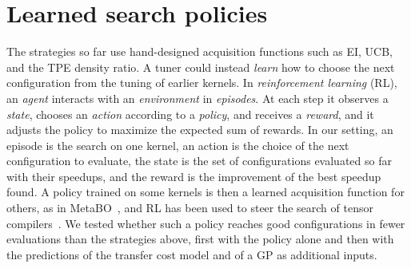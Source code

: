 \documentclass[10pt]{article}
\begin{document}
\section{Learned search policies}
\label{sec:rl}

The strategies so far use hand-designed acquisition functions such as EI,
UCB, and the TPE density ratio. A tuner could instead \emph{learn} how to
choose the next configuration from the tuning of earlier kernels. In
\emph{reinforcement learning} (RL), an \emph{agent} interacts with an
\emph{environment} in \emph{episodes}. At each step it observes a
\emph{state}, chooses an \emph{action} according to a \emph{policy}, and
receives a \emph{reward}, and it adjusts the policy to maximize the expected
sum of rewards. In our setting, an episode is the search on one kernel, an
action is the choice of the next configuration to evaluate, the state is the
set of configurations evaluated so far with their speedups, and the reward is
the improvement of the best speedup found. A policy trained on some kernels
is then a learned acquisition function for others, as in
MetaBO~\cite{volpp2020metabo}, and RL has been used to steer the search of
tensor compilers~\cite{ahn2020chameleon}. We tested whether such a policy
reaches good configurations in fewer evaluations than the strategies above,
first with the policy alone and then with the predictions of the transfer
cost model and of a GP as additional inputs.
\end{document}
